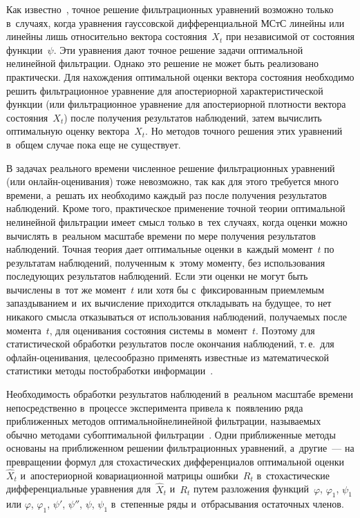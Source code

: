 \begin{multicols}{2}
\smallskip

Как известно~\cite{8-s1}, точное решение фильтрационных уравнений  возможно
только в~случаях, когда уравнения гауссовской дифференциальной МСтС
линейны или линейны лишь относительно вектора состояния~$X_t$ при
независимой от состояния функции~$\psi$. Эти уравнения
 дают точное решение задачи оптимальной нелинейной фильтрации.  Однако это решение
  не может быть реализовано практически. Для
 нахождения оптимальной оценки вектора состояния необходимо решить
 фильтрационное уравнение  для апостериорной характеристической функции
 (или  фильтрационное уравнение  для апостериорной плотности   вектора
 состояния~$X_t$) после получения результатов наблюдений, затем вы\-чис\-лить оптимальную оценку вектора~$X_t$.
Но методов точного решения этих
 уравнений  в~общем случае пока еще не существует.

 В задачах реального времени численное решение фильтрационных уравнений 
 (или он\-лайн-оце\-ни\-ва\-ния) тоже
 невозможно, так как для этого требуется много времени, а~решать их
 необходимо каждый раз после получения результатов наблюдений.
 Кроме того, практическое применение точной теории оптимальной нелинейной фильтрации
 имеет смысл только в~тех случаях, когда оценки можно вычислять 
 в~реальном масштабе времени по мере получения результатов
 наблюдений. Точная теория дает оптимальные
 оценки в~каждый момент~$t$ по результатам наблюдений, полученным
 к~этому моменту, без использования последующих результатов
 наблюдений. Если эти оценки не могут быть вычислены в~тот же
 момент~$t$ или хотя бы с~фиксированным приемлемым запаздыванием
 и~их вычисление приходится откладывать на будущее, то нет
 никакого смысла отказываться от использования наблюдений,
 получаемых после момента~$t$, для оценивания состояния системы 
 в~момент~$t$. Поэтому для статистической обработки результатов
 после окончания наблюдений, т.\,е.\ для оф\-лайн-оце\-ни\-ва\-ния,
 целесообразно применять известные из математической статистики методы
 постобработки информации~\cite{8-s1}.

 Необходимость обработки результатов наблюдений в~реальном
 масштабе времени непосредст\-вен\-но в~процессе эксперимента
 привела  к~появлению ряда приближенных методов оптимальной\linebreak нелиней\-ной  фильтрации,
 на\-зы\-ва\-емых обычно методами  субоптимальной фильтрации~\cite{8-s1}. Одни
 приближенные методы основаны на  приближенном решении фильтрационных
 уравнений, а~другие~---  на превращении формул
 для стохастических дифференциалов оптимальной
 оценки~$\hat X_t$ и~апостериорной ковариационной  матрицы ошибки~$R_t$ 
 в~стохастические дифференциальные уравнения  
 для~$\hat X_t$ и~$R_t$ путем разложения функций~$\varphi$, $\varphi_1$, 
 $\psi_1$ или $\varphi$, $\varphi_1$, $\psi'$, $\psi''$, $\psi$, $\psi_1$ 
 в~степенные ряды и~отбрасывания остаточных членов.


\end{multicols}
